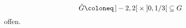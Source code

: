 \documentclass[draft,a5paper]{article}
\theoremstyle{remark}
\newcommand{\interval}[1]{\mathinner{#1}}
\begin{document}
\[\tilde{G} \coloneq \interval{]-2, 2[} \times \interval{]0, 1/3[} \subseteq G\]
offen.
\end{document}
